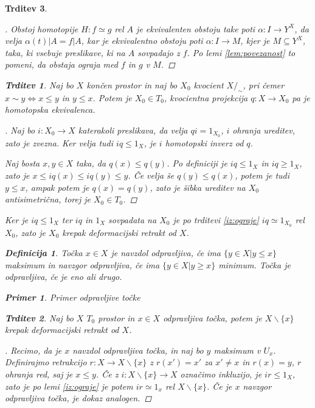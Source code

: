 \documentclass[a4paper,12pt]{article}
\theoremstyle{definition}
\newtheorem{definicija}{Definicija}
\theoremstyle{plain}
\theoremstyle{definition}
\newtheorem{primer}{Primer}
\theoremstyle{plain}
\newtheorem{trditev}{Trditev}
\theoremstyle{plain}
\theoremstyle{plain}
\theoremstyle{plain}
\newenvironment{dokaz}{\begin{proof}[\bfseries\upshape\proofname]}{\end{proof}}
\begin{document}
\begin{trditev}
\begin{dokaz}
    Obstoj homotopije $H:f\simeq g$ rel $A$ je ekvivalenten obstoju take poti $\alpha: I \rightarrow Y^X$, da velja $\alpha(t)|A=f|A$, kar je ekvivalentno obstoju poti 
    $\alpha: I \rightarrow M$, kjer je $M\subseteq Y^X$, taka, ki vsebuje preslikave, ki na $A$ sovpadajo z $f$. Po lemi \ref{lem:povezanost} to pomeni, da obstaja ograja 
    med $f$ in $g$ v $M$.
\end{dokaz}

\begin{trditev}
    Naj bo $X$ končen prostor in naj bo $X_0$ kvocient $X/_\sim$, pri čemer $x\sim y \Leftrightarrow x\le y$ in $y\le x$. Potem je $X_0\in T_0$, kvocientna projekcija $q:X\rightarrow X_0$ pa je homotopska ekvivalenca.
\end{trditev}

\begin{dokaz}
    Naj bo $i:X_0\rightarrow X$ katerakoli preslikava, da velja $qi=1_{X_0}$, $i$ ohranja ureditev, zato je zvezna. Ker velja tudi $iq \leq 1_X$, je $i$ homotopski inverz od $q$.

    Naj bosta $x,y\in X$ taka, da $q(x)\leq q(y)$. Po definiciji je $iq \leq 1_X$ in $iq \geq 1_X$, zato je $x \leq iq(x) \leq iq(y) \leq y$. Če velja še $q(y)\leq q(x)$, potem je tudi $y\leq x$, ampak potem je $q(x)=q(y)$, zato je šibka ureditev na $X_0$ antisimetrična, torej je $X_0\in T_0$.
\end{dokaz}


    Ker je $iq\leq 1_X$ ter $iq$ in $1_X$ sovpadata na $X_0$ je po trditevi \ref{iz:ograje} 
    $iq \simeq 1_{X_0}$ rel $X_0$, zato je $X_0$ krepak deformacijski retrakt od $X$.


\begin{definicija}
    Točka $x \in X$ je \textit{navzdol odpravljiva}, če ima $\{y\in X | y \le x\}$ maksimum in \textit{navzgor odpravljiva}, če ima $\{y\in X | y \ge x\}$ minimum. 
    Točka je odpravljiva, če je eno ali drugo.
\end{definicija}

\begin{primer}
    Primer odpravljive točke
\end{primer}

\begin{trditev}
Naj bo $X$ $T_0$ prostor in $x\in X$ odpravljiva točka, potem je $X\backslash \{x\}$ krepak deformacijski retrakt od $X$.
\end{trditev}

\begin{dokaz}
Recimo, da je $x$ navzdol odpravljiva točka, in naj bo $y$ 
maksimum v $U_x$. Definirajmo retrakcijo $r:X\rightarrow 
X\backslash \{x\}$ z $r(x')=x'$ za $x'\neq x$ in $r(x)=y$, 
$r$ ohranja red, saj je $x\leq y$. Če z $i:X\backslash\{x\} 
\rightarrow X$ označimo inkluzijo, je $ir\leq 1_X$, zato je 
po lemi \ref{iz:ograje} je potem $ir \simeq 1_x$ rel 
$X\backslash\{x\}$. Če je $x$ navzgor odpravljiva točka, je 
dokaz analogen.
\end{dokaz}


\end{trditev}
\end{document}
